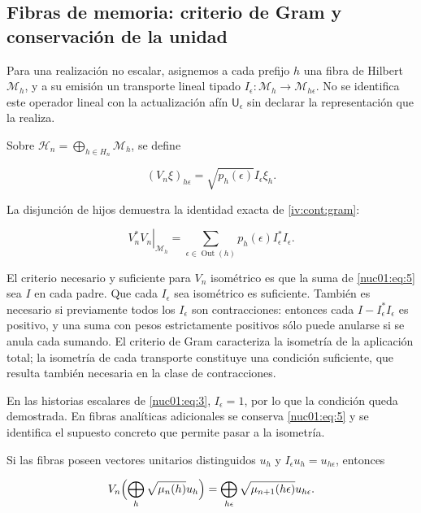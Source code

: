 \subsection{Fibras de memoria: criterio de Gram y conservación de la unidad}

Para una realización no escalar, asignemos a cada prefijo \(h\) una fibra de Hilbert \(\mathscr M_h\), y a su emisión un transporte lineal tipado
\(I_\epsilon:\mathscr M_h\to\mathscr M_{h\epsilon}\). No se identifica este operador lineal con la actualización afín \(\mathsf U_\epsilon\) sin declarar la representación que la realiza.

Sobre \(\mathscr H_n=\bigoplus_{h\in H_n}\mathscr M_h\), se define

\[
(V_n\xi)_{h\epsilon}=\sqrt{p_h(\epsilon)}I_\epsilon\xi_h.
\]

La disjunción de hijos demuestra la identidad exacta de \cref{iv:cont:gram}:

\begin{equation}
\left.V_n^*V_n\right|_{\mathscr M_h}
=\sum_{\epsilon\in\operatorname{Out}(h)}p_h(\epsilon)I_\epsilon^*I_\epsilon.
\label{nuc01:eq:5}
\end{equation}

El criterio necesario y suficiente para \(V_n\) isométrico es que la suma de \eqref{nuc01:eq:5} sea \(I\) en cada padre. Que cada \(I_\epsilon\) sea isométrico es suficiente. También es necesario si previamente todos los \(I_\epsilon\) son contracciones: entonces cada \(I-I_\epsilon^*I_\epsilon\) es positivo, y una suma con pesos estrictamente positivos sólo puede anularse si se anula cada sumando. El criterio de Gram caracteriza la isometría de la aplicación total; la isometría de cada transporte constituye una condición suficiente, que resulta también necesaria en la clase de contracciones.

En las historias escalares de \eqref{nuc01:eq:3}, \(I_\epsilon=1\), por lo que la condición queda demostrada. En fibras analíticas adicionales se conserva \eqref{nuc01:eq:5} y se identifica el supuesto concreto que permite pasar a la isometría.

Si las fibras poseen vectores unitarios distinguidos \(u_h\) y \(I_\epsilon u_h=u_{h\epsilon}\), entonces

\begin{equation}
V_n\Bigl(\bigoplus_h\sqrt{\mu_n(h)}u_h\Bigr)
=\bigoplus_{h\epsilon}\sqrt{\mu_{n+1}(h\epsilon)}u_{h\epsilon}.
\label{nuc01:eq:6}
\end{equation}

